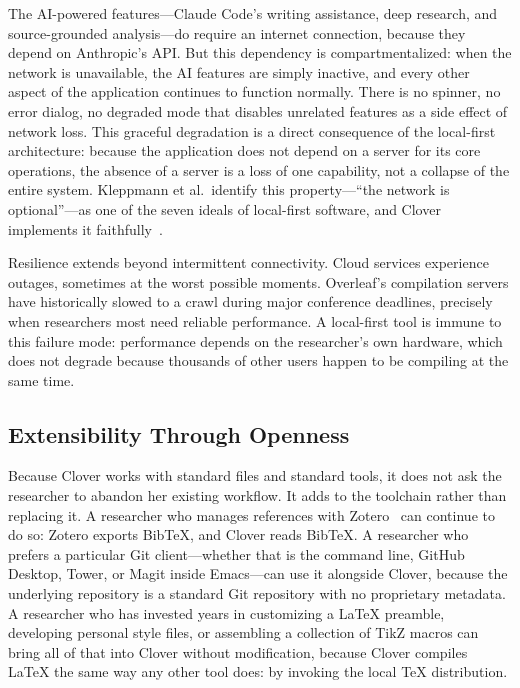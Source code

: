 \documentclass[a4paper,11pt]{article}
\begin{document}
The AI-powered features---Claude Code's writing assistance, deep research, and source-grounded analysis---do require an internet connection, because they depend on Anthropic's API. But this dependency is compartmentalized: when the network is unavailable, the AI features are simply inactive, and every other aspect of the application continues to function normally. There is no spinner, no error dialog, no degraded mode that disables unrelated features as a side effect of network loss. This graceful degradation is a direct consequence of the local-first architecture: because the application does not depend on a server for its core operations, the absence of a server is a loss of one capability, not a collapse of the entire system. Kleppmann et al.\ identify this property---``the network is optional''---as one of the seven ideals of local-first software, and Clover implements it faithfully~\cite{Kleppmann2019LocalFirst}.

Resilience extends beyond intermittent connectivity. Cloud services experience outages, sometimes at the worst possible moments. Overleaf's compilation servers have historically slowed to a crawl during major conference deadlines, precisely when researchers most need reliable performance. A local-first tool is immune to this failure mode: performance depends on the researcher's own hardware, which does not degrade because thousands of other users happen to be compiling at the same time.

\subsection{Extensibility Through Openness}

Because Clover works with standard files and standard tools, it does not ask the researcher to abandon her existing workflow. It adds to the toolchain rather than replacing it. A researcher who manages references with Zotero~\cite{Zotero} can continue to do so: Zotero exports BibTeX, and Clover reads BibTeX. A researcher who prefers a particular Git client---whether that is the command line, GitHub Desktop, Tower, or Magit inside Emacs---can use it alongside Clover, because the underlying repository is a standard Git repository with no proprietary metadata. A researcher who has invested years in customizing a \LaTeX{} preamble, developing personal style files, or assembling a collection of TikZ macros can bring all of that into Clover without modification, because Clover compiles \LaTeX{} the same way any other tool does: by invoking the local TeX distribution.
\end{document}
